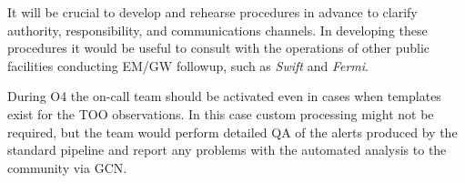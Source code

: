\documentclass[OPS,toc,lsstdraft]{lsstdoc}
\begin{document}
It will be crucial to develop and rehearse procedures in advance to clarify authority, responsibility, and communications channels. 
In developing these procedures it would be useful to consult with the operations of other public facilities conducting EM/GW followup, such as \textit{Swift} and \textit{Fermi}.

During O4 the on-call team should be activated even in cases when templates exist for the TOO observations.
In this case custom processing might not be required, but the team would perform detailed QA of the alerts produced by the standard pipeline and report any problems with the automated analysis to the community via GCN.

%


\end{document}
